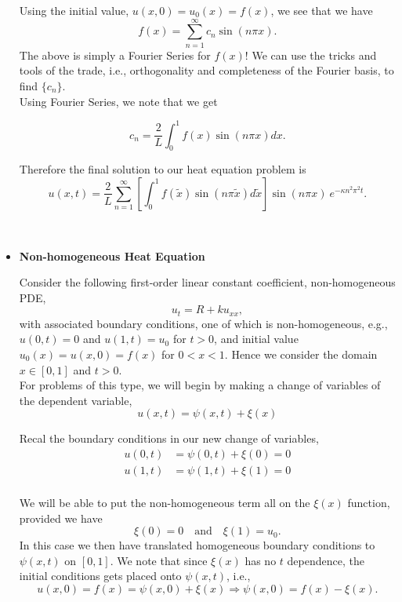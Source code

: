 \begin{itemize}
Using the initial value, $u(x,0)=u_0(x) = f(x)$, we see that we have $$f(x) = \sum_{n=1}^{\infty} c_n \sin(n\pi x).$$ The above is simply a Fourier Series for $f(x)$! We can use the tricks and tools of the trade, i.e., orthogonality and completeness of the Fourier basis, to find $\{ c_n\}$.\\

Using Fourier Series, we note that we get

$$c_n = \frac{2}{L} \int_0^1 f(x) \sin(n\pi x) dx.$$

Therefore the final solution to our heat equation problem is $$u(x,t) =\frac{2}{L}  \sum_{n=1}^{\infty} \left[ \int_0^1 f(\tilde{x}) \sin(n\pi \tilde{x}) d\tilde{x} \right] \sin(n\pi x) \ e^{-\kappa n^2 \pi^2 t}.$$

$ $\\

%
%
\item[] {\bf{Non-homogeneous Heat Equation}}

Consider the following first-order linear constant coefficient, non-homogeneous PDE, $$u_t = R + k u_{xx},$$ with associated boundary conditions, one of which is non-homogeneous, e.g., $u(0,t)=0$ and $u(1,t)=u_0$ for $t>0$, and initial value $u_0(x)=u(x,0) = f(x)$ for $0<x<1$. Hence we consider the domain $x\in[0,1]$ and $t>0$. \\

For problems of this type, we will begin by making a change of variables of the dependent variable, 
\begin{equation}
\label{nonhomo_change} u(x,t) = \psi(x,t) + \xi(x)
\end{equation}

Recal the boundary conditions in our new change of variables, 
\begin{align*}
u(0,t) &= \psi(0,t) + \xi(0) = 0 \\
u(1,t) &= \psi(1,t) + \xi(1) = 0 \\
\end{align*}

We will be able to put the non-homogeneous term all on the $\xi(x)$ function, provided we have $$\xi(0) = 0 \ \ \ \mbox{ and } \ \ \ \xi(1) = u_0.$$ In this case we then have translated homogeneous boundary conditions to $\psi(x,t)$ on $[0,1]$. We note that since $\xi(x)$ has no $t$ dependence, the initial conditions gets placed onto $\psi(x,t)$, i.e., $$u(x,0) = f(x) =  \psi(x,0) + \xi(x) \Rightarrow \psi(x,0) = f(x) - \xi(x).$$


\end{itemize}
